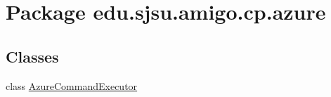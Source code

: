 \hypertarget{namespaceedu_1_1sjsu_1_1amigo_1_1cp_1_1azure}{}\section{Package edu.\+sjsu.\+amigo.\+cp.\+azure}
\label{namespaceedu_1_1sjsu_1_1amigo_1_1cp_1_1azure}
\subsection*{Classes}
\begin{DoxyCompactItemize}
\item 
class \hyperlink{classedu_1_1sjsu_1_1amigo_1_1cp_1_1azure_1_1_azure_command_executor}{Azure\+Command\+Executor}
\end{DoxyCompactItemize}
